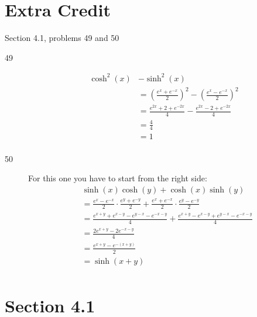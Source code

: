 \documentclass{exam}
\begin{document}
  \section{Extra Credit}
  Section 4.1, problems 49 and 50

  \ifprintanswers
    \begin{description}
      \item[49]
        \begin{align*}
          \cosh^2(x) &- \sinh^2(x) \\
                     &= \left( \frac{e^x + e^{-x}}{2} \right)^2 - \left( \frac{e^x - e^{-x}}{2} \right)^2 \\
                     &= \frac{e^{2x} + 2 + e^{-2x}}{4} - \frac{e^{2x} - 2 + e^{-2x}}{4} \\
                     &= \frac{4}{4} \\
                     &= 1 \\
        \end{align*}

      \item[50]
        For this one you have to start from the right side:
        \begin{align*}
          & \sinh(x) \cosh(y) + \cosh(x) \sinh(y) \\
          &= \frac{e^x - e^{-x}}{2} \cdot \frac{e^y + e^{-y}}{2} 
               + \frac{e^x + e^{-x}}{2} \cdot \frac{e^y - e^{-y}}{2} \\
          &= \frac{e^{x + y} + e^{x - y} - e^{y - x} - e^{-x - y}}{4} 
              + \frac{e^{x + y} - e^{x - y} + e^{y - x} - e^{-x - y}}{4} \\
          &= \frac{2e^{x + y} - 2e^{-x - y}}{4} \\
          &= \frac{e^{x + y} - e^{-(x + y)}}{2} \\
          &= \sinh(x + y) \\
        \end{align*}
        
    \end{description}


    \section{Section 4.1}
\end{document}
